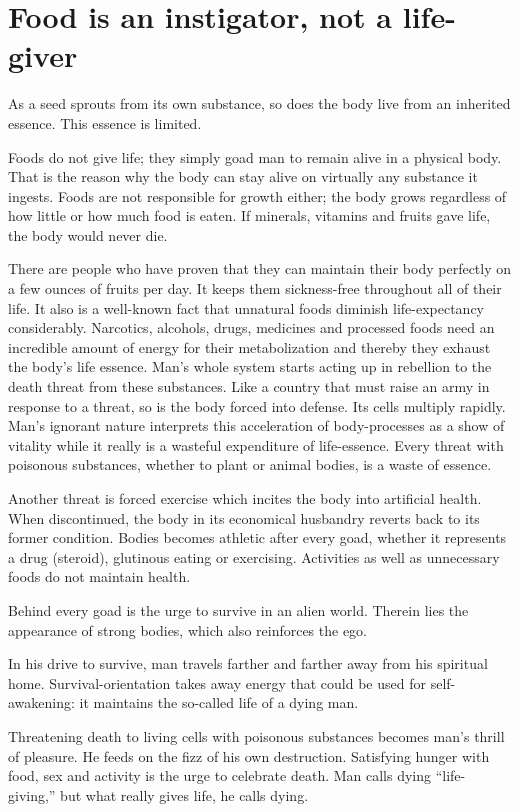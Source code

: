 \documentclass[12pt,letterpaper]{article}
\begin{document}
\section{Food is an instigator, not a life-giver}

As a seed sprouts from its own substance, so does the body live from
an inherited essence. This essence is limited.

Foods do not give life; they simply goad man to remain alive in a
physical body. That is the reason why the body can stay alive on
virtually any substance it ingests. Foods are not responsible for
growth either; the body grows regardless of how little or how much
food is eaten. If minerals, vitamins and fruits gave life, the body
would never die.

There are people who have proven that they can maintain their body
perfectly on a few ounces of fruits per day. It keeps them
sickness-free throughout all of their life. It also is a well-known
fact that unnatural foods diminish life-expectancy
considerably. Narcotics, alcohols, drugs, medicines and processed
foods need an incredible amount of energy for their metabolization and
thereby they exhaust the body's life essence. Man's whole system
starts acting up in rebellion to the death threat from these
substances. Like a country that must raise an army in response to a
threat, so is the body forced into defense. Its cells multiply
rapidly. Man's ignorant nature interprets this acceleration of
body-processes as a show of vitality while it really is a wasteful
expenditure of life-essence. Every threat with poisonous substances,
whether to plant or animal bodies, is a waste of essence.

Another threat is forced exercise which incites the body into
artificial health. When discontinued, the body in its economical
husbandry reverts back to its former condition. Bodies becomes
athletic after every goad, whether it represents a drug (steroid),
glutinous eating or exercising. Activities as well as unnecessary
foods do not maintain health.

Behind every goad is the urge to survive in an alien world. Therein
lies the appearance of strong bodies, which also reinforces the ego.

In his drive to survive, man travels farther and farther away from his
spiritual home. Survival-orientation takes away energy that could be
used for self-awakening: it maintains the so-called life of a dying
man.

Threatening death to living cells with poisonous substances becomes
man's thrill of pleasure. He feeds on the fizz of his own
destruction. Satisfying hunger with food, sex and activity is the urge
to celebrate death. Man calls dying ``life-giving,'' but what really
gives life, he calls dying.
\end{document}
